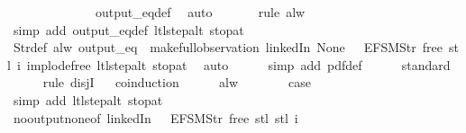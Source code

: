 \begin{isabellebody}
\ \ \ \ \ \ \isamarkupfalse%
\ {}\isanewline
\ \ \ \ \isamarkupfalse%
\ output_eq{\isacharunderscore}def\ \isamarkupfalse%
\ auto{\isacharbrackleft}{}{\isacharbrackright}\isanewline
\ \ \ \ \ \isamarkupfalse%
\ {\isacharparenleft}rule\ alw{\isacharparenright}\isanewline
\ \ \ \ \ \ \isamarkupfalse%
\ {\isacharparenleft}simp\ add{\isacharcolon}\ output_eq{\isacharunderscore}def\ ltl{\isacharunderscore}step{\isacharunderscore}alt\ stop{\isacharunderscore}at{\isacharunderscore}{}{\isacharparenright}\isanewline
\ \ \ \ \isamarkupfalse%
\ Str{\isacharunderscore}def\ {\isacartoucheopen}alw\ {\isacharparenleft}output_eq\ {\isacharbrackleft}{\isacharbrackright}{\isacharparenright}\ {\isacharparenleft}make{\isacharunderscore}full{\isacharunderscore}observation\ linkedIn\ None\ {\isacharparenleft}{\isacharless}{\isachargreater}{\isacharparenleft}{}\ {\isacharcolon}{\isacharequal}\ EFSM{\isachardot}Str\ {\isacharprime}{\isacharprime}free{\isacharprime}{\isacharprime}{\isacharparenright}{\isacharparenright}\ {\isacharparenleft}stl\ i{\isacharparenright}{\isacharparenright}{\isacartoucheclose}\ implode{\isacharunderscore}free\ ltl{\isacharunderscore}step{\isacharunderscore}alt\ stop{\isacharunderscore}at{\isacharunderscore}{}\ \isamarkupfalse%
\ auto{\isacharbrackleft}{}{\isacharbrackright}\isanewline
\ \ \ \ \isamarkupfalse%
\ {\isacharparenleft}simp\ add{\isacharcolon}\ pdf{}{\isacharunderscore}def{\isacharparenright}\isanewline
\ \ \ \ \isamarkupfalse%
\ standard\isanewline
\ \ \ \ \isamarkupfalse%
\ {\isacharparenleft}rule\ disjI{}{\isacharparenright}\isanewline
\ \ \isamarkupfalse%
{\isacharparenleft}coinduction{\isacharparenright}\isanewline
\ \ \ \ \isamarkupfalse%
\ alw\isanewline
\ \ \ \ \isamarkupfalse%
\ \isamarkupfalse%
\ {\isacharquery}case\isanewline
\ \ \ \ \ \ \isamarkupfalse%
\ {\isacharparenleft}simp\ add{\isacharcolon}\ ltl{\isacharunderscore}step{\isacharunderscore}alt\ stop{\isacharunderscore}at{\isacharunderscore}{}{\isacharparenright}\isanewline
\ \ \ \ \isamarkupfalse%
\ no{\isacharunderscore}output{\isacharunderscore}none{\isacharbrackleft}of\ linkedIn\ {\isachardoublequoteopen}{\isacharparenleft}{\isacharless}{\isachargreater}{\isacharparenleft}{}\ {\isacharcolon}{\isacharequal}\ EFSM{\isachardot}Str\ {\isacharprime}{\isacharprime}free{\isacharprime}{\isacharprime}{\isacharparenright}{\isacharparenright}{\isachardoublequoteclose}\ {\isachardoublequoteopen}stl\ {\isacharparenleft}stl\ i{\isacharparenright}{\isachardoublequoteclose}{\isacharbrackright}\isanewline

\end{isabellebody}
